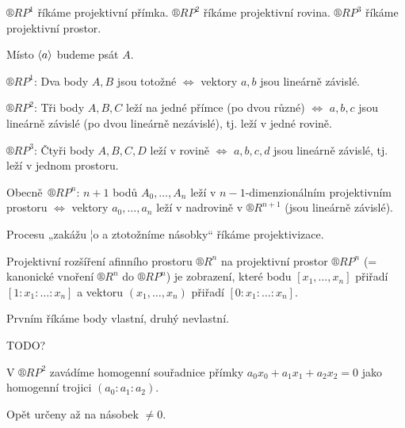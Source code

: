 \documentclass[12pt]{article}					%
\begin{document}
\begin{definice}
	$®RP^1$ říkáme projektivní přímka.
	$®RP^2$ říkáme projektivní rovina.
	$®RP^3$ říkáme projektivní prostor.
\end{definice}

\begin{poznamka}[Značení]
	Místo $\left\langle a\right\rangle$ budeme psát $A$.
\end{poznamka}

\begin{poznamka}
	$®RP^1$: Dva body $A, B$ jsou totožné $\Leftrightarrow$ vektory $a, b$ jsou lineárně závislé.

	$®RP^2$: Tři body $A, B, C$ leží na jedné přímce (po dvou různé) $\Leftrightarrow$ $a, b, c$ jsou lineárně závislé (po dvou lineárně nezávislé), tj. leží v jedné rovině.

	$®RP^3$: Čtyři body $A, B, C, D$ leží v rovině $\Leftrightarrow$ $a, b, c, d$ jsou lineárně závislé, tj. leží v jednom prostoru.

	Obecně $®RP^n$: $n+1$ bodů $A_0, …, A_n$ leží v $n-1$-dimenzionálním projektivním prostoru $\Leftrightarrow$ vektory $a_0, …, a_n$ leží v nadrovině v $®R^{n+1}$ (jsou lineárně závislé).
\end{poznamka}

\begin{poznamka}
	Procesu „zakážu ¦o a ztotožníme násobky“ říkáme projektivizace.
\end{poznamka}

\begin{definice}
	Projektivní rozšíření afinního prostoru $®R^n$ na projektivní prostor $®RP^n$ (= kanonické vnoření $®R^n$ do $®RP^n$) je zobrazení, které bodu $[x_1, …, x_n]$ přiřadí $[1:x_1:…:x_n]$ a vektoru $(x_1, …, x_n)$ přiřadí $[0:x_1:…:x_n]$.

	Prvním říkáme body vlastní, druhý nevlastní.
\end{definice}

TODO?

\begin{definice}
	V $®RP^2$ zavádíme homogenní souřadnice přímky $a_0 x_0 + a_1 x_1 + a_2 x_2 = 0$ jako homogenní trojici $(a_0:a_1:a_2)$.

	\begin{poznamkain}
		Opět určeny až na násobek $≠ 0$.
	\end{poznamkain}
\end{definice}
\end{document}
